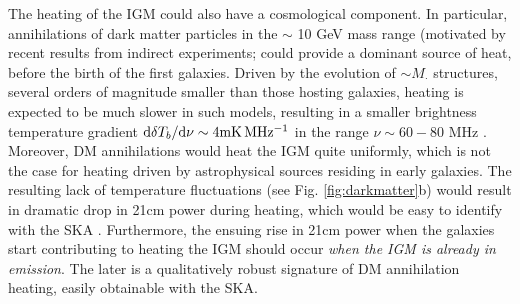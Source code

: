 \documentclass{PoS}
\newcommand{\ud}{{\rm d}}
\begin{document}
The heating of the IGM could also have a cosmological component.  In particular, annihilations of dark matter particles in the $\sim$ 10 GeV mass range (motivated by recent results from indirect experiments; \cite[e.g.][]{2009Natur.458..607A, 2010JCAP...04..014A,2013PhRvL.110n1102A}
could provide a dominant source of heat, before the birth of the first galaxies.  Driven by the evolution of $\sim M_\cdot$ structures, several orders of magnitude smaller than those hosting galaxies, heating is expected to be much slower in such models, resulting in a smaller brightness temperature gradient  $\ud\delta T_b/\ud\nu \sim4 {\rm mK\, MHz^{-1}}$ in the range $\nu \sim 60 - 80$ MHz \citep{2013MNRAS.429.1705V}.  Moreover, DM annihilations would heat the IGM quite uniformly, which is not the case for heating driven by astrophysical sources residing in early galaxies.  The resulting lack of temperature fluctuations (see Fig. \ref{fig:darkmatter}b) would result in dramatic drop in 21cm power during heating, which would be easy to identify with the SKA \citep{2014arXiv1408.1109E}.  Furthermore, the ensuing rise in 21cm power when the galaxies start contributing to heating the IGM should occur {\em when the IGM is already in emission}.  The later is a qualitatively robust signature of DM annihilation heating, easily obtainable with the SKA.
\end{document}

